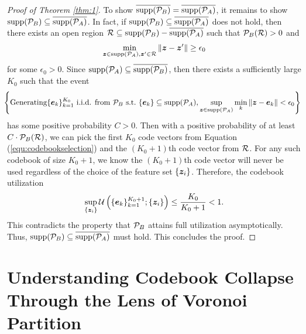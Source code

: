 \begin{proof}[Proof of Theorem \ref{thm:1}]
    To show $\overline{\mathrm{supp}(\mathcal{P}_B)}=\overline{\mathrm{supp}(\mathcal{P}_A)}$, it remains to show $\mathrm{supp}(\mathcal{P}_B)\subseteq\overline{\mathrm{supp}(\mathcal{P}_A)}$. In fact, if $\mathrm{supp}(\mathcal{P}_B)\subseteq\overline{\mathrm{supp}(\mathcal{P}_A)}$ does not hold, then there exists an open region $
    \mathcal{R}\subseteq \mathrm{supp}(\mathcal{P}_B)-\overline{\mathrm{supp}(\mathcal{P}_A)}
    $ 
    such that $\mathcal{P}_B(\mathcal{R})>0$ and 
    \begin{align}
    \min_{\bm{z}\in\mathrm{supp}(\mathcal{P}_A),\bm{z}'\in\mathcal{R}}\| \bm{z}-\bm{z}'\|\geq\epsilon_0
    \end{align}
    for some $\epsilon_0>0$. Since $\mathrm{supp}(\mathcal{P}_A)\subseteq\overline{\mathrm{supp}(\mathcal{P}_B)}$, then there exists a sufficiently large $K_0$ such that the event  
    \begin{align}\label{equ:codebookselection}
   \!\!\! \left\{\textnormal{Generating}\{\bm{e}_k\}_{k=1}^{K_0} \textnormal{ i.i.d. from }\mathcal{P}_B \textnormal{~s.t.~}  \{\bm{e}_k\}\subseteq\mathrm{supp}(\mathcal{P}_A), \sup_{\bm{z}\in\mathrm{supp}(\mathcal{P}_A)}\min_k\| \bm{z}-\bm{e}_k\|<\epsilon_0\right\}
    \end{align}
    has some positive probability $C>0$. Then with a positive probability of at least {$C\cdot\mathcal{P}_B(\mathcal{R})$}, we can pick the first $K_0$ code vectors from Equation (\ref{equ:codebookselection}) and the $(K_0+1)$th code vector from $\mathcal{R}$. For any such codebook of size $K_0+1$, we know the $(K_0+1)$th code vector will never be used regardless of the choice of the feature set $\{\bm{z}_i\}$. Therefore, the codebook utilization 
    \begin{align}
    \sup_{\{\bm{z}_i\}}\mathcal{U}\left(\{\bm{e}_k\}_{k=1}^{K_0+1};\{\bm{z}_i\}\right)\leq \frac{K_0}{K_0+1}<1.
    \end{align}
    This contradicts the property that $\mathcal{P}_B$ attains full utilization asymptotically. Thus, $\mathrm{supp}(\mathcal{P}_B)\subseteq\overline{\mathrm{supp}(\mathcal{P}_A)}$ must hold. This concludes the proof.  
\end{proof} 

\section{Understanding Codebook Collapse Through the Lens of Voronoi Partition}
\label{appendix:understanding codebook collapse by Voronoi Partition}

